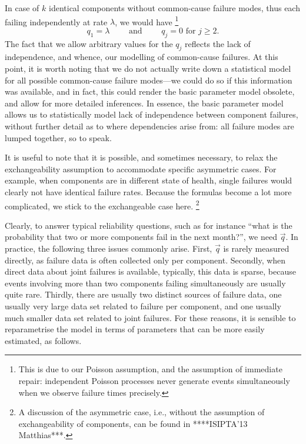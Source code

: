 In case of $k$ identical components without common-cause failure modes,
thus each failing independently at rate $\lambda$, we would have%
\footnote{This is due to our Poisson assumption, and the assumption of immediate repair:
independent Poisson processes never generate events simultaneously when we observe failure times precisely.}
\begin{equation*}
  q_1=\lambda\qquad \text{ and }\qquad q_j=0\text{ for }j\ge 2.
\end{equation*}
The fact that we allow arbitrary values for the $q_j$ reflects
the lack of independence, and whence, our modelling of common-cause failures.
At this point, it is worth noting that we do not actually write down a statistical model
for all possible common-cause failure modes---we could do so if this information was available,
and in fact, this could render the basic parameter model obsolete,
and allow for more detailed inferences.
In essence, the basic parameter model allows us to statistically model
lack of independence between component failures,
without further detail as to where dependencies arise from:
all failure modes are lumped together, so to speak.

It is useful to note that it is possible, and sometimes necessary,
to relax the exchangeability assumption
to accommodate specific asymmetric cases.
For example, when components are in different state of health,
single failures would clearly not have identical failure rates.
Because the formulas become a lot more complicated,
we stick to the exchangeable case here.%
\footnote{A discussion of the asymmetric case, i.e., without the assumption of exchangeability of components,
can be found in ****ISIPTA'13 Matthias***.}

Clearly, to answer typical reliability questions, such as for instance
``what is the probability that two or more components fail in the next month?'',
we need $\vec{q}$.
In practice, the following three issues commonly arise.
First, $\vec{q}$ is rarely measured directly,
as failure data is often collected only per component.
Secondly, when direct data about joint failures is available,
typically, this data is sparse,
because events involving more than two components failing simultaneously are usually quite rare.
Thirdly, there are usually two distinct sources of failure data,
one usually very large data set related to failure per component,
and one usually much smaller data set related to joint failures.
For these reasons,
it is sensible to reparametrise the model in terms
of parameters that can be more easily estimated, as follows.


